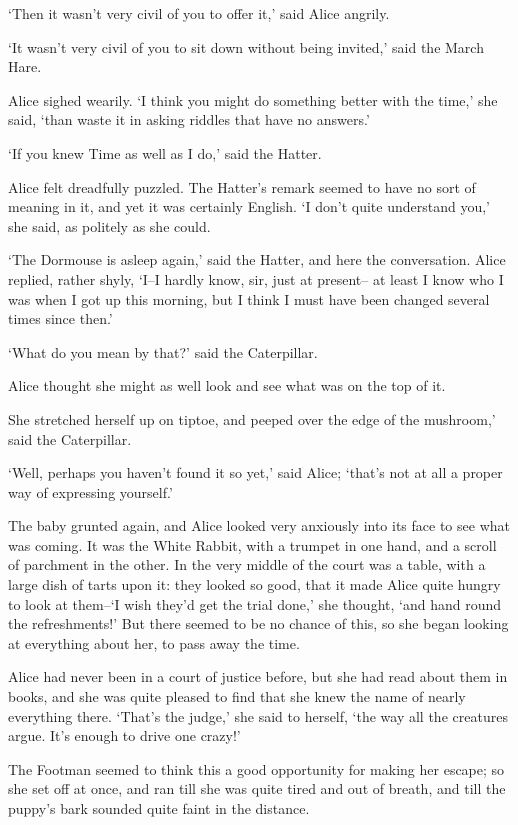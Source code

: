 \documentclass[statementpaper,twoside,openany]{memoir}
\begin{document}
`Then it wasn't very civil of you to offer it,' said Alice angrily.

`It wasn't very civil of you to sit down without being invited,' said the March Hare.

Alice sighed wearily. `I think you might do something better with the time,' she said, `than waste it in asking riddles that have no answers.'

`If you knew Time as well as I do,' said the Hatter.

Alice felt dreadfully puzzled. The Hatter's remark seemed to have no sort of meaning in it, and yet it was certainly English. `I don't quite understand you,' she said, as politely as she could.

`The Dormouse is asleep again,' said the Hatter, and here the conversation. Alice replied, rather shyly, `I--I hardly know, sir, just at present-- at least I know who I was when I got up this morning, but I think I must have been changed several times since then.'

`What do you mean by that?' said the Caterpillar.

Alice thought she might as well look and see what was on the top of it.

She stretched herself up on tiptoe, and peeped over the edge of the mushroom,' said the Caterpillar.

`Well, perhaps you haven't found it so yet,' said Alice; `that's not at all a proper way of expressing yourself.'

The baby grunted again, and Alice looked very anxiously into its face to see what was coming. It was the White Rabbit, with a trumpet in one hand, and a scroll of parchment in the other. In the very middle of the court was a table, with a large dish of tarts upon it: they looked so good, that it made Alice quite hungry to look at them--`I wish they'd get the trial done,' she thought, `and hand round the refreshments!' But there seemed to be no chance of this, so she began looking at everything about her, to pass away the time.

Alice had never been in a court of justice before, but she had read about them in books, and she was quite pleased to find that she knew the name of nearly everything there. `That's the judge,' she said to herself, `the way all the creatures argue. It's enough to drive one crazy!'

The Footman seemed to think this a good opportunity for making her escape; so she set off at once, and ran till she was quite tired and out of breath, and till the puppy's bark sounded quite faint in the distance.
\end{document}
